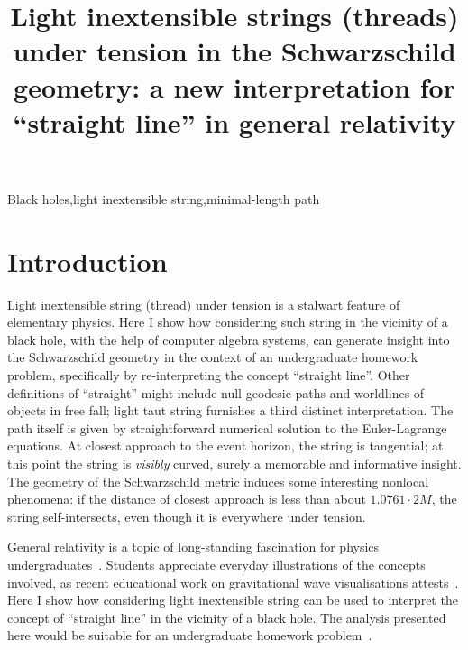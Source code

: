 \documentclass[review]{elsarticle}
\begin{document}
\begin{frontmatter}
\title{Light inextensible strings (threads) under tension in the
  Schwarzschild geometry: a new interpretation for ``straight line''
  in general relativity}






\begin{keyword}
Black holes\sep light inextensible string\sep minimal-length path
\end{keyword}

\end{frontmatter}

\linenumbers
\section{Introduction}

Light inextensible string (thread) under tension is a stalwart feature
of elementary physics.  Here I show how considering such string in the
vicinity of a black hole, with the help of computer algebra systems,
can generate insight into the Schwarzschild geometry in the context of
an undergraduate homework problem, specifically by re-interpreting the
concept ``straight line''.  Other definitions of ``straight'' might
include null geodesic paths and worldlines of objects in free fall;
light taut string furnishes a third distinct interpretation.  The path
itself is given by straightforward numerical solution to the
Euler-Lagrange equations.  At closest approach to the event horizon,
the string is tangential; at this point the string is {\em visibly}
curved, surely a memorable and informative insight.  The geometry of
the Schwarzschild metric induces some interesting nonlocal phenomena:
if the distance of closest approach is less than about $1.0761\cdot
2M$, the string self-intersects, even though it is everywhere under
tension.  

General relativity is a topic of long-standing fascination for physics
undergraduates~\cite{christensen2012}.  Students appreciate everyday
illustrations of the concepts involved, as recent educational work on
gravitational wave visualisations attests~\cite{overduin2018}.  Here I
show how considering light inextensible string can be used to
interpret the concept of ``straight line'' in the vicinity of a black
hole.  The analysis presented here would be suitable for an
undergraduate homework problem~\cite{romano2019}.
\end{document}
